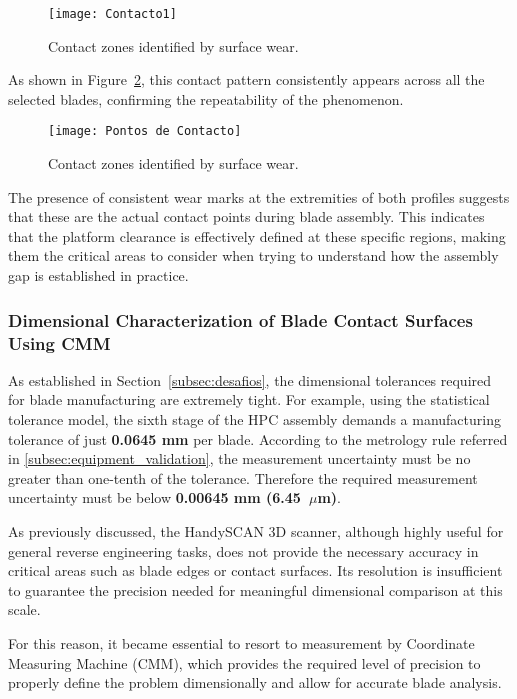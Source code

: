 \begin{figure}[H]
    \centering
    \texttt{[image: Contacto1]}
    \caption{Contact zones identified by surface wear.}
    \label{fig:contacto1}
\end{figure}

As shown in Figure~\ref{fig:contact}, this contact pattern consistently appears across all the selected blades, confirming the repeatability of the phenomenon. 

\begin{figure}[H]
    \centering
    \texttt{[image: Pontos de Contacto]}
    \caption{Contact zones identified by surface wear.}
    \label{fig:contact}
\end{figure}

The presence of consistent wear marks at the extremities of both profiles suggests that these are the actual contact points during blade assembly. This indicates that the platform clearance is effectively defined at these specific regions, making them the critical areas to consider when trying to understand how the assembly gap is established in practice.

\subsubsection{Dimensional Characterization of Blade Contact Surfaces Using CMM}
\label{cha:contactocmm}

As established in Section~\ref{subsec:desafios}, the dimensional tolerances required for blade manufacturing are extremely tight. For example, using the statistical tolerance model, the sixth stage of the HPC assembly demands a manufacturing tolerance of just \textbf{0.0645 mm} per blade. According to the metrology rule referred in \ref{subsec:equipment_validation}, the measurement uncertainty must be no greater than one-tenth of the tolerance. Therefore the required measurement uncertainty must be below \textbf{0.00645 mm (6.45~$\mu$m)}.

As previously discussed, the HandySCAN 3D scanner, although highly useful for general reverse engineering tasks, does not provide the necessary accuracy in critical areas such as blade edges or contact surfaces. Its resolution is insufficient to guarantee the precision needed for meaningful dimensional comparison at this scale.

For this reason, it became essential to resort to measurement by Coordinate Measuring Machine (CMM), which provides the required level of precision to properly define the problem dimensionally and allow for accurate blade analysis.

